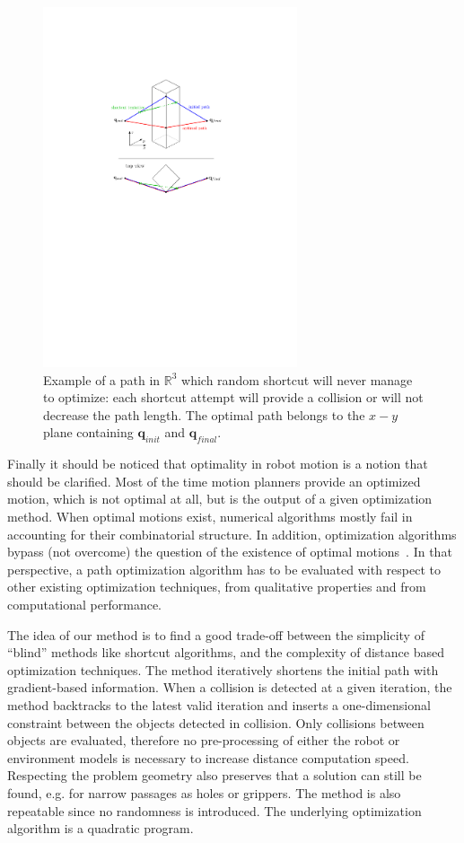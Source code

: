\documentclass{tADR2e}
\newcommand\real{\mathbb{R}}
\newcommand\conf{\mathbf{q}}
\begin{document}
\begin{figure}
	\centering
	\includegraphics[width=7.5cm]{decoupled_DOF_optimization.pdf}
	\caption{Example of a path in $\real^3$ which random shortcut will never manage to 
	optimize: each shortcut attempt will provide a collision or will not 
	decrease the path length. The optimal path belongs to the $x-y$ plane 
	containing $\conf_{init}$ and $\conf_{final}$.}
	\label{decoupled_DOF_optimization}
\end{figure}



Finally it should be noticed that optimality in robot motion is a notion that should be clarified. Most of the 
time motion planners provide an optimized motion, which is not optimal at all, but is the output of a given 
optimization method. When optimal motions exist, numerical
algorithms mostly fail in accounting for their combinatorial structure. In addition, optimization algorithms 
bypass (not overcome) the question of the existence of optimal motions~\cite{LaumondOptim}. In that perspective, 
a path optimization algorithm has to be evaluated with respect to other existing optimization techniques, 
from qualitative properties and from computational performance.

The idea of our method is to find a good trade-off between
the simplicity of “blind” methods like shortcut algorithms,
and the complexity of distance based optimization techniques.
The method iteratively shortens the initial path with gradient-based information.
When a collision is detected at a given iteration, the method backtracks to the
latest valid iteration and inserts a one-dimensional constraint
between the objects detected in collision. Only collisions between objects are 
evaluated, therefore no pre-processing of either the
robot or environment models is necessary to increase distance computation speed. 
Respecting the problem geometry also 
preserves that a solution can still be found, e.g. for narrow passages as holes or 
grippers. The method is also repeatable since no randomness is introduced. The underlying optimization algorithm is a quadratic program.
\end{document}
